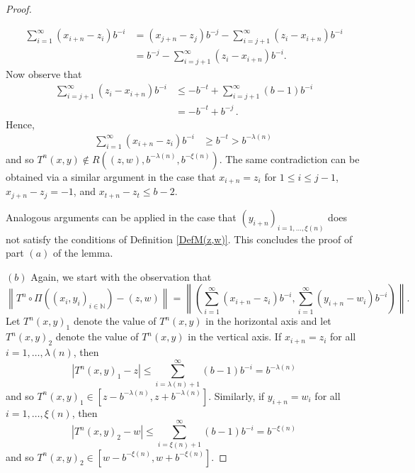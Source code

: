 \documentclass[12pt]{article}
\theoremstyle{remark}
\numberwithin{equation}{section}
\renewcommand{\Bbb}[1]{\mathbb{#1}}
\newcommand{\N}{{\Bbb N}}         %
\newcommand{\0}{\mathbf{0}}
\begin{document}
\begin{proof}
\begin{enumerate}[(i)]
\begin{align*}
 \sum_{i=1}^{\infty}(x_{i+n}-z_{i})b^{-i} &= (x_{j+n}-z_{j})b^{-j}-\sum_{i=j+1}^{\infty}(z_{i}-x_{i+n})b^{-i} \\[1ex]
 &= b^{-j}-\sum_{i=j+1}^{\infty}{(z_i-x_{i+n})b^{-i}}.
 \end{align*}
 Now observe that 
 \begin{align*}
     \sum_{i=j+1}^{\infty}{(z_i-x_{i+n})b^{-i}} &\leq -b^{-t}+\sum_{i=j+1}^{\infty}(b-1)b^{-i} \\[1ex] 
     &=-b^{-t}+b^{-j}\, .
 \end{align*}
 Hence,
 \begin{align*}
\sum_{i=1}^{\infty}(x_{i+n}-z_{i})b^{-i}&\geq b^{-t}>b^{-\lambda(n)}\,
 \end{align*} 
and so $T^{n}(x,y) \not \in R\left((z,w), b^{-\lambda(n)}, b^{-\xi(n)} \right)$. The same {contradiction can be obtained via a similar argument} in the case that $x_{i+n}=z_i$ for $1 \leq i \leq j-1$, $x_{j+n}-z_{j}=-1$, and \mbox{$x_{t+n}-z_{t} \leq b-2$}.
\end{enumerate}
Analogous arguments can be applied in the case that $(y_{i+n})_{i=1,\dots,\xi(n)}$ does not satisfy the conditions of Definition \ref{DefM(z,w)}. This concludes the proof of part $(a)$ of the lemma.

\vspace{1ex}
\noindent $(b)$ Again, we start with the observation that
 \begin{equation*}
     \left\|T^{n} \circ \Pi\left((x_{i},y_{i})_{i \in \N}\right)-(z,w)\right\|=\left\|\left(\sum_{i=1}^{\infty}(x_{i+n}-z_{i})b^{-i}, \sum_{i=1}^{\infty}(y_{i+n}-w_{i})b^{-i} \right) \right\|.
 \end{equation*}
Let $T^{n}(x,y)_{1}$ denote the value of $T^{n}(x,y)$ in the horizontal axis and let $T^{n}(x,y)_{2}$ denote the value of $T^{n}(x,y)$ in the vertical axis. If $x_{i+n}=z_{i}$ for all $i=1, \dots , \lambda(n)$, then
 \begin{equation*}
|T^n(x,y)_1-z| \leq \sum_{i=\lambda(n)+1}^{\infty}(b-1)b^{-i}=b^{-\lambda(n)}
 \end{equation*}
 and so $T^{n}(x,y)_{1} \in [z-b^{-\lambda(n)},z+b^{-\lambda(n)}]$. Similarly, if $y_{i+n}=w_{i}$ for all $i=1, \dots , \xi(n)$, then
 \begin{equation*}
|T^n(x,y)_2-w| \leq \sum_{i=\xi(n)+1}^{\infty}(b-1)b^{-i}=b^{-\xi(n)}
 \end{equation*}
 and so $T^{n}(x,y)_{2} \in [w-b^{-\xi(n)},w+b^{-\xi(n)}]$. 
 

\end{proof}
\end{document}
